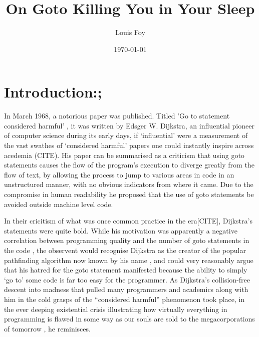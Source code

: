 \documentclass{journal}
\title{On Goto Killing You in Your Sleep}
\author{Louis Foy}
\date{\today}
\begin{document}
\maketitle


\section{\textunderscore \textunderscore Introduction:;}
In March 1968, a notorious paper was published. Titled 'Go to statement considered harmful' \cite{goto}, it was written by Edsger W. Dijkstra, an influential pioneer of computer science during its early days, if `influential' were a measurement of the vast swathes of `considered harmful' papers one could instantly inspire across acedemia (CITE). His paper can be summarised as a criticism that using goto statements causes the flow of the program's execution to diverge greatly from the flow of text, by allowing the process to jump to various areas in code in an unstructured manner, with no obvious indicators from where it came. Due to the compromise in human readability he proposed that the use of goto statements be avoided outside machine level code.

In their cricitism of what was once common practice in the era[CITE], Dijkstra's statements were quite bold. While his motivation was apparently a negative correlation between programming quality and the number of goto statements in the code \cite{goto}, the observent would recognise Dijkstra as the creator of the popular pathfinding algorithm now known by his name \cite{pathfinding}, and could very reasonably argue that his hatred for the goto statement manifested because the ability to simply `go to' some code is far too easy for the programmer. As Dijkstra's collision-free descent into madness that pulled many programmers and academics along with him in the cold grasps of the ``considered harmful'' phenomenon took place, in the ever deeping existential crisis illustrating how virtually everything in programming is flawed in some way as our souls are sold to the megacorporations of tomorrow \cite{truths}, he reminisces.
\end{document}
